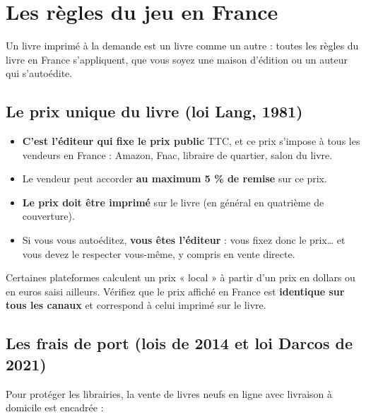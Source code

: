 \section{Les règles du jeu en France}

Un livre imprimé à la demande est un livre comme un autre : toutes les
règles du livre en France s’appliquent, que vous soyez une maison
d’édition ou un auteur qui s’autoédite.

\subsection{Le prix unique du livre (loi Lang, 1981)}

\begin{itemize}
  \item \textbf{C’est l’éditeur qui fixe le prix public} TTC, et ce prix
        s’impose à tous les vendeurs en France : Amazon, Fnac, libraire
        de quartier, salon du livre.
  \item Le vendeur peut accorder \textbf{au maximum 5 \% de remise}
        sur ce prix.
  \item \textbf{Le prix doit être imprimé} sur le livre (en général en
        quatrième de couverture).
  \item Si vous vous autoéditez, \textbf{vous êtes l’éditeur} : vous
        fixez donc le prix… et vous devez le respecter vous-même, y
        compris en vente directe.
\end{itemize}

\begin{attention}
Certaines plateformes calculent un prix « local » à partir d’un prix en
dollars ou en euros saisi ailleurs. Vérifiez que le prix affiché en
France est \textbf{identique sur tous les canaux} et correspond à celui
imprimé sur le livre.
\end{attention}

\subsection{Les frais de port (lois de 2014 et loi Darcos de 2021)}

Pour protéger les librairies, la vente de livres neufs en ligne avec
livraison à domicile est encadrée :


